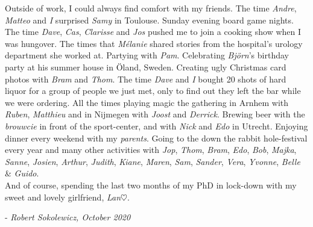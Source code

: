Outside of work, I could always find comfort with my friends. The time \emph{Andre}, \emph{Matteo} and \emph{I} surprised \emph{Samy} in Toulouse. Sunday evening board game nights. The time \emph{Dave}, \emph{Cas}, \emph{Clarisse} and \emph{Jos} pushed me to join a cooking show when I was hungover. The times that \emph{M\'elanie} shared stories from the hospital's urology department she worked at. Partying with \emph{Pam}. Celebrating \emph{Bj\"orn}'s birthday party at his summer house in \"Oland, Sweden. 
Creating ugly Christmas card photos with \emph{Bram} and \emph{Thom}. The time \emph{Dave} and \emph{I} bought 20 shots of hard liquor for a group of people we just met, only to find out they left the bar while we were ordering. All the times playing magic the gathering in Arnhem with \emph{Ruben}, \emph{Matthieu} and in Nijmegen with \emph{Joost} and \emph{Derrick}.
Brewing beer with the \emph{brouwcie} in front of the sport-center, and with \emph{Nick} and \emph{Edo} in Utrecht. Enjoying dinner every weekend with my \emph{parents}. Going to the down the rabbit hole-festival every year and many other activities with \emph{Jop}, \emph{Thom}, \emph{Bram}, \emph{Edo}, \emph{Bob}, \emph{Majka}, \emph{Sanne}, \emph{Josien}, \emph{Arthur}, \emph{Judith}, \emph{Kiane}, \emph{Maren}, \emph{Sam}, \emph{Sander}, \emph{Vera}, \emph{Yvonne}, \emph{Belle} \& \emph{Guido}. \\[0.5em]


And of course, spending the last two months of my PhD in lock-down with my sweet and lovely girlfriend, \emph{Lan}$\heartsuit$.

\begin{flushright} - \emph{Robert Sokolewicz, October 2020}\end{flushright}
